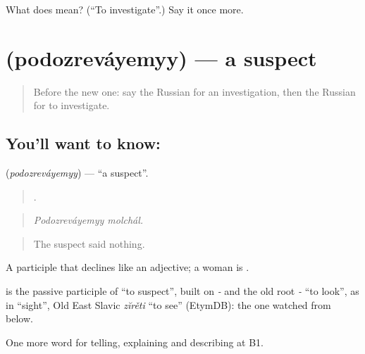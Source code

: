\begin{tcolorbox}[breakable,colback=teal!4,colframe=teal!35!black,title={Before you move on}]
What does  mean? (\textquotedblleft{}To investigate\textquotedblright{}.) Say it once more.
\end{tcolorbox}
\section[\texorpdfstring{\ru{подозреваемый} (podozreváyemyy)}{подозреваемый (podozreváyemyy)}]{ (podozreváyemyy) — a suspect}

\label{lesson:RU-C291-podozrevayemyy}



\begin{quote}
Before the new one: say the Russian for an investigation, then the Russian for to investigate.
\end{quote}

\subsection*{You'll want to know: }
\textbf{} (\emph{podozreváyemyy}) — \textquotedblleft{}a suspect\textquotedblright{}.

\begin{quote}
 .
\end{quote}

\begin{quote}
\emph{Podozreváyemyy molchál.}
\end{quote}

\begin{quote}
The suspect said nothing.
\end{quote}

A participle that declines like an adjective; a woman is \emph{}.

\begin{cousinweb}
\emph{} is the passive participle of \emph{} \textquotedblleft{}to suspect\textquotedblright{}, built on \emph{-} and the old root \emph{-} \textquotedblleft{}to look\textquotedblright{}, as in \emph{} \textquotedblleft{}sight\textquotedblright{}, Old East Slavic \emph{zĭrěti} \textquotedblleft{}to see\textquotedblright{} (EtymDB): the one watched from below.
\end{cousinweb}

\begin{grammarlens}[title={What you've built}]
One more word for telling, explaining and describing at B1.
\end{grammarlens}

